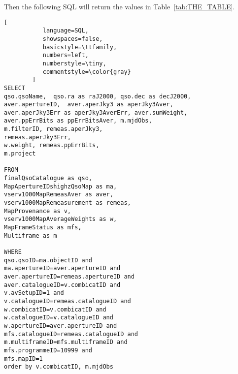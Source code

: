\lstset{upquote=true}

\noindent
Then the following SQL will return the values in
Table~\ref{tab:THE_TABLE}.

\begin{lstlisting}[
           language=SQL,
           showspaces=false,
           basicstyle=\ttfamily,
           numbers=left,
           numberstyle=\tiny,
           commentstyle=\color{gray}
        ]
SELECT 
qso.qsoName,  qso.ra as raJ2000, qso.dec as decJ2000, 
aver.apertureID,  aver.aperJky3 as aperJky3Aver, 
aver.aperJky3Err as aperJky3AverErr, aver.sumWeight, 
aver.ppErrBits as ppErrBitsAver, m.mjdObs, 
m.filterID, remeas.aperJky3, 
remeas.aperJky3Err, 
w.weight, remeas.ppErrBits, 
m.project

FROM 
finalQsoCatalogue as qso,  
MapApertureIDshighzQsoMap as ma,  
vserv1000MapRemeasAver as aver,  
vserv1000MapRemeasurement as remeas,  
MapProvenance as v,  
vserv1000MapAverageWeights as w, 
MapFrameStatus as mfs, 
Multiframe as m  

WHERE 
qso.qsoID=ma.objectID and 
ma.apertureID=aver.apertureID and 
aver.apertureID=remeas.apertureID and 
aver.catalogueID=v.combicatID and 
v.avSetupID=1 and 
v.catalogueID=remeas.catalogueID and 
w.combicatID=v.combicatID and 
w.catalogueID=v.catalogueID and 
w.apertureID=aver.apertureID and 
mfs.catalogueID=remeas.catalogueID and 
m.multiframeID=mfs.multiframeID and 
mfs.programmeID=10999 and 
mfs.mapID=1 
order by v.combicatID, m.mjdObs
\end{lstlisting}
